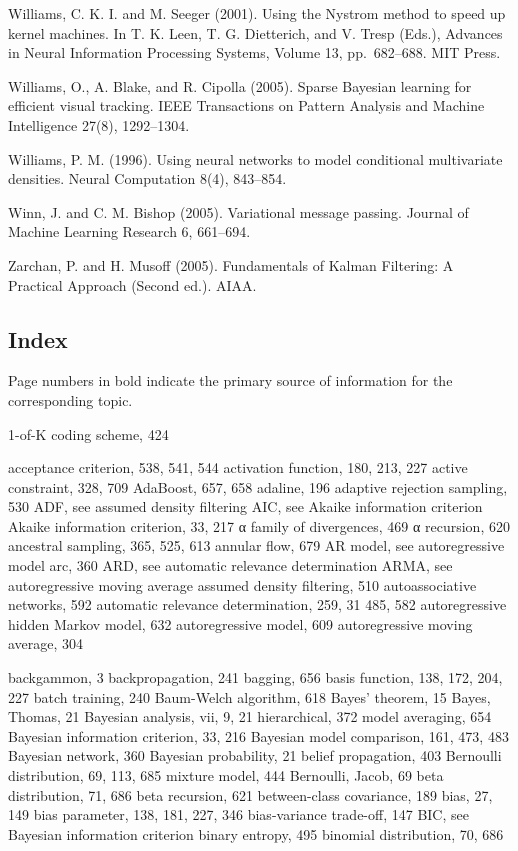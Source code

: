 \documentclass[
  10
]{article}
\begin{document}
Williams, C. K. I. and M. Seeger (2001). Using the Nystrom method to
speed up kernel machines. In T. K. Leen, T. G. Dietterich, and V. Tresp
(Eds.), Advances in Neural Information Processing Systems, Volume 13,
pp.~682--688. MIT Press.

Williams, O., A. Blake, and R. Cipolla (2005). Sparse Bayesian learning
for efficient visual tracking. IEEE Transactions on Pattern Analysis and
Machine Intelligence 27(8), 1292--1304.

Williams, P. M. (1996). Using neural networks to model conditional
multivariate densities. Neural Computation 8(4), 843--854.

Winn, J. and C. M. Bishop (2005). Variational message passing. Journal
of Machine Learning Research 6, 661--694.

Zarchan, P. and H. Musoff (2005). Fundamentals of Kalman Filtering: A
Practical Approach (Second ed.). AIAA.

\subsection{Index}\label{index}

Page numbers in bold indicate the primary source of information for the
corresponding topic.

1-of-K coding scheme, 424

acceptance criterion, 538, 541, 544 activation function, 180, 213, 227
active constraint, 328, 709 AdaBoost, 657, 658 adaline, 196 adaptive
rejection sampling, 530 ADF, see assumed density filtering AIC, see
Akaike information criterion Akaike information criterion, 33, 217 α
family of divergences, 469 α recursion, 620 ancestral sampling, 365,
525, 613 annular flow, 679 AR model, see autoregressive model arc, 360
ARD, see automatic relevance determination ARMA, see autoregressive
moving average assumed density filtering, 510 autoassociative networks,
592 automatic relevance determination, 259, 31 485, 582 autoregressive
hidden Markov model, 632 autoregressive model, 609 autoregressive moving
average, 304

backgammon, 3 backpropagation, 241 bagging, 656 basis function, 138,
172, 204, 227 batch training, 240 Baum-Welch algorithm, 618 Bayes'
theorem, 15 Bayes, Thomas, 21 Bayesian analysis, vii, 9, 21
hierarchical, 372 model averaging, 654 Bayesian information criterion,
33, 216 Bayesian model comparison, 161, 473, 483 Bayesian network, 360
Bayesian probability, 21 belief propagation, 403 Bernoulli distribution,
69, 113, 685 mixture model, 444 Bernoulli, Jacob, 69 beta distribution,
71, 686 beta recursion, 621 between-class covariance, 189 bias, 27, 149
bias parameter, 138, 181, 227, 346 bias-variance trade-off, 147 BIC, see
Bayesian information criterion binary entropy, 495 binomial
distribution, 70, 686
\end{document}
